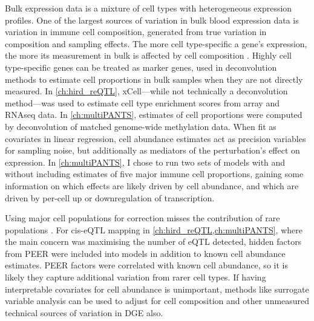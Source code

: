 Bulk expression data is a mixture of cell types with heterogeneous expression profiles.
One of the largest sources of variation in bulk blood expression data is variation in immune cell composition, generated from true variation in composition and sampling effects.
The more cell type-specific a gene's expression, the more its measurement in bulk is affected by cell composition \autocite{farahbod2020UntanglingEffectsCellular}.
Highly cell type-specific genes can be treated as marker genes, 
used in deconvolution methods to estimate cell proportions in bulk samples when they are not directly measured.
In \cref{ch:hird_reQTL}, xCell---while not technically a deconvolution method---was used to estimate cell type enrichment scores from array and \gls{RNAseq} data.
In \cref{ch:multiPANTS}, estimates of cell proportions were computed by deconvolution of matched genome-wide methylation data.
When fit as covariates in linear regression, 
cell abundance estimates act as precision variables for sampling noise, 
but additionally as mediators of the perturbation's effect on expression.
In \cref{ch:multiPANTS}, I chose to run two sets of models with and without including estimates of five major immune cell proportions,
gaining some information on which effects are likely driven by cell abundance, and which are driven by per-cell up or downregulation of transcription.

Using major cell populations for correction misses the contribution of rare populations \autocite{pellegrinocoppola2020CorrectionBothCommon}.
For cis-\gls{eQTL} mapping in \cref{ch:hird_reQTL,ch:multiPANTS}, where the main concern was maximising the number of \gls{eQTL} detected,
hidden factors from PEER were included into models in addition to known cell abundance estimates.
PEER factors were correlated with known cell abundance, so it is likely they capture additional variation from rarer cell types.
If having interpretable covariates for cell abundance is unimportant,
methods like surrogate variable analysis \autocite{leek2014SvaseqRemovingBatch,liu2016EvaluationMethodsRemoving}
can be used to adjust for cell composition and other unmeasured technical sources of variation in \gls{DGE} also.

